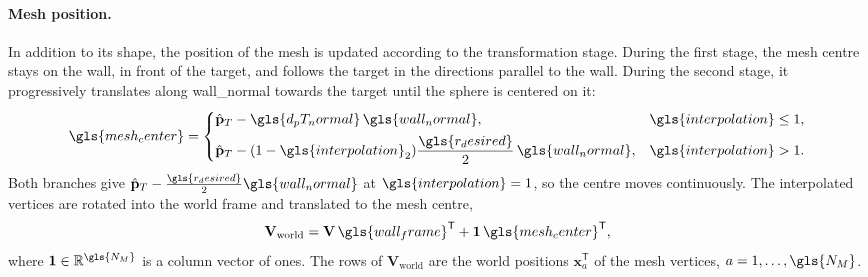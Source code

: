 \paragraph{Mesh position.}
In addition to its shape, the position of the mesh is updated according to the transformation stage. During the first stage, the mesh centre stays on the wall, in front of the target, and follows the target in the directions parallel to the wall. During the second stage, it progressively translates along \gls{wall_normal} towards the target until the sphere is centered on it:
\begin{equation}
    \gls{mesh_center}
    =
    \begin{cases}
        \hat{\mathbf{p}}_T-\gls{d_pT_normal}\,\gls{wall_normal}, & \gls{interpolation}\le1,\\[4pt]
        \hat{\mathbf{p}}_T-(1-\gls{interpolation}_2)\dfrac{\gls{r_desired}}{2}\,\gls{wall_normal}, & \gls{interpolation}>1.
    \end{cases}
    \label{eq.6:mesh_center}
\end{equation}
Both branches give $\hat{\mathbf{p}}_T-\tfrac{\gls{r_desired}}{2}\gls{wall_normal}$ at $\gls{interpolation}=1$, so the centre moves continuously. The interpolated vertices are rotated into the world frame and translated to the mesh centre,
\begin{equation}
    \mathbf{V}_{\mathrm{world}}
    =
    \mathbf{V}\,\gls{wall_frame}^{\mathsf T}
    +
    \mathbf{1}\,\gls{mesh_center}^{\mathsf T},
    \label{eq.6:world_vertices}
\end{equation}
where $\mathbf{1}\in\mathbb{R}^{\gls{N_M}}$ is a column vector of ones. The rows of $\mathbf{V}_{\mathrm{world}}$ are the world positions $\mathbf{x}_a^{\mathsf T}$ of the mesh vertices, $a=1,\dots,\gls{N_M}$.

